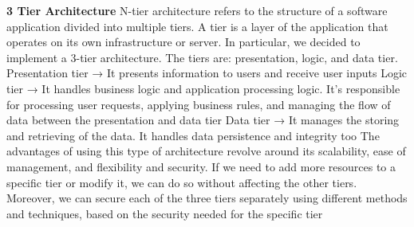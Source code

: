\textbf{3 Tier Architecture}\newline
N-tier architecture refers to the structure of a software application divided into multiple tiers. 
A tier is a layer of the application that operates on its own infrastructure or server. 
In particular, we decided to implement a 3-tier architecture. The tiers are: presentation, logic, and data tier.\newline
Presentation tier → It presents information to users and receive user inputs\newline
Logic tier → It handles business logic and application processing logic. It’s responsible for processing user requests, 
applying business rules, and managing the flow of data between the presentation and data tier\newline
Data tier → It manages the storing and retrieving of the data. It handles data persistence and integrity too\newline
The advantages of using this type of architecture revolve around its scalability, ease of management, and flexibility and security. 
If we need to add more resources to a specific tier or modify it, we can do so without affecting the other tiers. Moreover, we can secure each 
of the three tiers separately using different methods and techniques, based on the security needed for the specific tier


